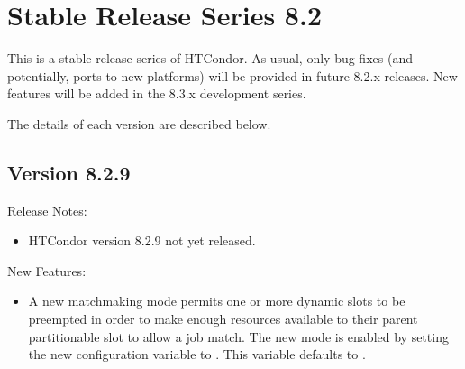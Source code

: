 
\section{\label{sec:History-8-2}Stable Release Series 8.2}

This is a stable release series of HTCondor.
As usual, only bug fixes (and potentially, ports to new platforms)
will be provided in future 8.2.x releases.
New features will be added in the 8.3.x development series.

The details of each version are described below.


\subsection*{\label{sec:New-8-2-9}Version 8.2.9}

\noindent Release Notes:

\begin{itemize}

\item HTCondor version 8.2.9 not yet released.

\end{itemize}


\noindent New Features:

\begin{itemize}

\item A new matchmaking mode permits one or more dynamic slots to
be preempted in order to make enough resources available to their parent
partitionable slot to allow a job match.
The new mode is enabled by setting the new configuration variable
 to .
This variable defaults to .

\end{itemize}

